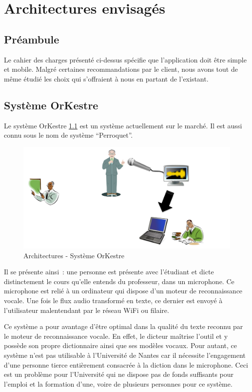 \chapter{Architectures envisagés}

\section{Préambule}
Le cahier des charges présenté ci-dessus spécifie que l'application doit être
simple et mobile. Malgré certaines recommandations par le client, nous avons
tout de même étudié les choix qui s'offraient à nous en partant de l'existant.

\section{Système OrKestre}

Le système OrKestre \ref{fig:orkestre} est un système actuellement sur le marché. Il est aussi
connu sous le nom de système ``Perroquet''.


\begin{figure}[h]
 \centering
 \includegraphics[scale=0.5]{./img/orKestre.png}
 \caption{Architectures - Système OrKestre}
 \label{fig:orkestre}
\end{figure}

Il se présente ainsi~: une personne est présente avec l'étudiant et dicte distinctement le cours qu'elle entends du professeur, dans un microphone. Ce microphone est relié à un ordinateur qui dispose d'un moteur de reconnaissance vocale. Une fois le flux audio transformé en texte, ce dernier est envoyé à l'utilisateur malentendant par le réseau WiFi ou filaire.

Ce système a pour avantage d'être optimal dans la qualité du texte reconnu par le moteur de reconnaissance vocale. En effet, le dicteur maîtrise l'outil et y possède son propre dictionnaire ainsi que ses modèles vocaux. 
Pour autant, ce système n'est pas utilisable à l'Université de Nantes car il nécessite l'engagement d'une personne tierce entièrement consacrée à la diction dans le microphone. Ceci est un problème pour l'Université qui ne dispose pas de fonds suffisants pour l'emploi et la formation d'une, voire de plusieurs personnes pour ce système.

